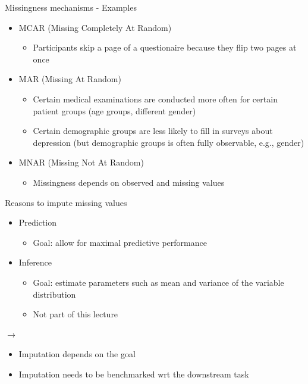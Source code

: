 \documentclass[11pt,compress,t,notes=noshow, aspectratio=169, xcolor=table]{beamer}
\begin{document}
\begin{frame}{Missingness mechanisms - Examples}
    \vfill
    \begin{itemize}
        \item MCAR (Missing Completely At Random)
        \begin{itemize}
            \item Participants skip a page of a questionaire because they flip two pages at once
        \end{itemize}
        \item MAR (Missing At Random)
        \begin{itemize}
            \item Certain medical examinations are conducted more often for certain patient groups (age groups, different gender)
            \item Certain demographic groups are less likely to fill in surveys about depression (but demographic groups is often fully observable, e.g., gender)
        \end{itemize}
        \item MNAR (Missing Not At Random)
        \begin{itemize}
            \item Missingness depends on observed and missing values
        \end{itemize}
    \end{itemize}    
    \vfill
\end{frame}

\begin{frame}{Reasons to impute missing values}
    \vfill
    \begin{itemize}
        \item Prediction
        \begin{itemize}
            \item Goal: allow for maximal predictive performance
        \end{itemize}
        \item Inference
        \begin{itemize}
            \item Goal: estimate parameters such as mean and variance of the variable distribution
            \item Not part of this lecture
        \end{itemize}
    \end{itemize}
    \vfill
    $\rightarrow$ 
    \begin{itemize}
        \item Imputation depends on the goal
        \item Imputation needs to be benchmarked wrt the downstream task
    \end{itemize}
    \vfill
\end{frame}
\end{document}
